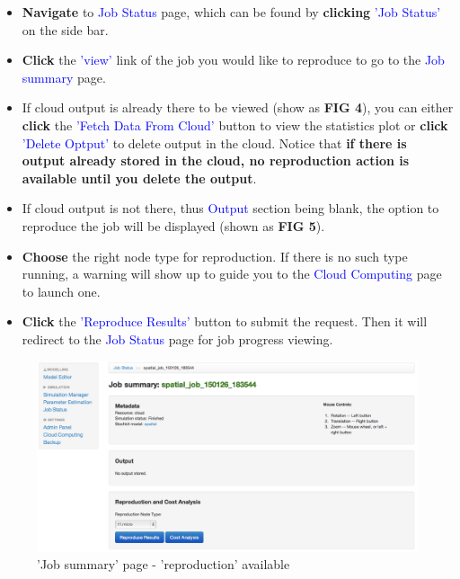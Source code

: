 \documentclass[12pt,notitlepage,nofootinbib]{revtex4}
\begin{document}
\begin{itemize}
\item \textbf{Navigate} to \textcolor{blue}{Job Status} page, which can be found by \textbf{clicking} \textcolor{blue}{'Job Status'} on the side bar.
\item \textbf{Click} the \textcolor{blue}{'view'} link of the job you would like to reproduce to go to the \textcolor{blue}{Job summary} page.
\item If cloud output is already there to be viewed (show as \textbf{FIG 4}), you can either \textbf{click} the \textcolor{blue}{'Fetch Data From Cloud'} button to view the statistics plot or \textbf{click} \textcolor{blue}{'Delete Optput'} to delete output in the cloud. Notice that \textbf{if there is output already stored in the cloud, no reproduction action is available until you delete the output}.
\item If cloud output is not there, thus \textcolor{blue}{Output} section being blank, the option to reproduce the job will be displayed (shown as \textbf{FIG 5}).
\item \textbf{Choose} the right node type for reproduction. If there is no such type running, a warning will show up to guide you to the \textcolor{blue}{Cloud Computing} page to launch one.
\item \textbf{Click} the \textcolor{blue}{'Reproduce Results'} button to submit the request. Then it will redirect to the \textcolor{blue}{Job Status} page for job progress viewing.

\end{itemize}

\begin{figure}[!ht]
\centering
\includegraphics[scale=0.35]{T6_fig_reproduction1.png}
\caption{'Job summary' page - 'reproduction' available}
\label{fig:2}
\end{figure}
\end{document}
